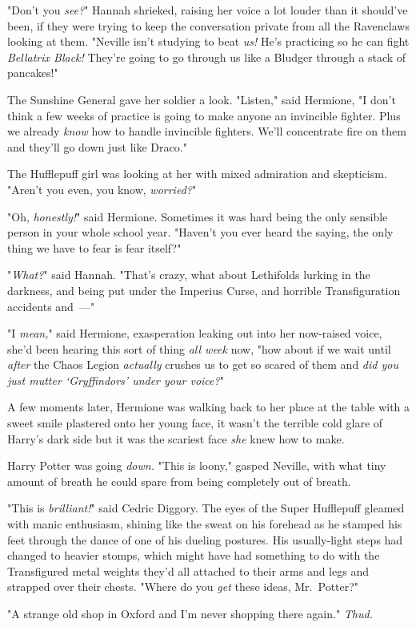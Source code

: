"Don't you \emph{see?}" Hannah shrieked, raising her voice a lot louder than it
should've been, if they were trying to keep the conversation private from all
the Ravenclaws looking at them. "Neville isn't studying to beat \emph{us!} He's
practicing so he can fight \emph{Bellatrix Black!} They're going to go through
us like a Bludger through a stack of pancakes!"

The Sunshine General gave her soldier a look. "Listen," said Hermione, "I don't
think a few weeks of practice is going to make anyone an invincible fighter.
Plus we already \emph{know} how to handle invincible fighters. We'll
concentrate fire on them and they'll go down just like Draco."

The Hufflepuff girl was looking at her with mixed admiration and skepticism.
"Aren't you even, you know, \emph{worried?}"

"Oh, \emph{honestly!}" said Hermione. Sometimes it was hard being the only
sensible person in your whole school year. "Haven't you ever heard the saying,
the only thing we have to fear is fear itself?"

"\emph{What?}" said Hannah. "That's crazy, what about Lethifolds lurking in the
darkness, and being put under the Imperius Curse, and horrible Transfiguration
accidents and~---"

"I \emph{mean,}" said Hermione, exasperation leaking out into her now-raised
voice, she'd been hearing this sort of thing \emph{all week} now, "how about if
we wait until \emph{after} the Chaos Legion \emph{actually} crushes us to get
so scared of them and \emph{did you just mutter `Gryffindors' under your
voice?}"

A few moments later, Hermione was walking back to her place at the table with a
sweet smile plastered onto her young face, it wasn't the terrible cold glare of
Harry's dark side but it was the scariest face \emph{she} knew how to make.

Harry Potter was going \emph{down.}
\sbreak
"This is loony," gasped Neville, with what tiny amount of breath he could spare
from being completely out of breath.

"This is \emph{brilliant!}" said Cedric Diggory. The eyes of the Super
Hufflepuff gleamed with manic enthusiasm, shining like the sweat on his
forehead as he stamped his feet through the dance of one of his dueling
postures. His usually-light steps had changed to heavier stomps, which might
have had something to do with the Transfigured metal weights they'd all
attached to their arms and legs and strapped over their chests. "Where do you
\emph{get} these ideas, Mr.~Potter?"

"A strange old shop{\el} in Oxford{\el} and I'm never{\el} shopping
there{\el} again." \emph{Thud.}
